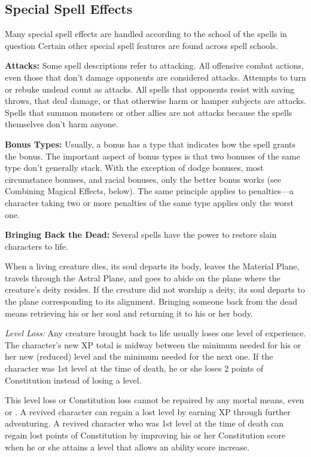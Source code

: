 \subsection{Special Spell Effects}
Many special spell effects are handled according to the school of the spells in question Certain other special spell features are found across spell schools.

\textbf{Attacks:} Some spell descriptions refer to attacking. All offensive combat actions, even those that don't damage opponents are considered attacks. Attempts to turn or rebuke undead count as attacks. All spells that opponents resist with saving throws, that deal damage, or that otherwise harm or hamper subjects are attacks. Spells that summon monsters or other allies are not attacks because the spells themselves don't harm anyone.

\textbf{Bonus Types:} Usually, a bonus has a type that indicates how the spell grants the bonus. The important aspect of bonus types is that two bonuses of the same type don't generally stack. With the exception of dodge bonuses, most circumstance bonuses, and racial bonuses, only the better bonus works (see Combining Magical Effects, below). The same principle applies to penalties---a character taking two or more penalties of the same type applies only the worst one.

\textbf{Bringing Back the Dead:} Several spells have the power to restore slain characters to life.

When a living creature dies, its soul departs its body, leaves the Material Plane, travels through the Astral Plane, and goes to abide on the plane where the creature's deity resides. If the creature did not worship a deity, its soul departs to the plane corresponding to its alignment. Bringing someone back from the dead means retrieving his or her soul and returning it to his or her body.

\textit{Level Loss:} Any creature brought back to life usually loses one level of experience. The character's new XP total is midway between the minimum needed for his or her new (reduced) level and the minimum needed for the next one. If the character was 1st level at the time of death, he or she loses 2 points of Constitution instead of losing a level.

This level loss or Constitution loss cannot be repaired by any mortal means, even  or . A revived character can regain a lost level by earning XP through further adventuring. A revived character who was 1st level at the time of death can regain lost points of Constitution by improving his or her Constitution score when he or she attains a level that allows an ability score increase.

